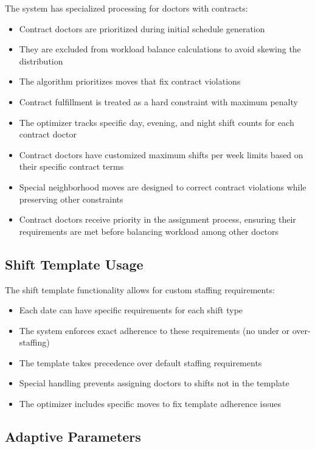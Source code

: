 \documentclass[12pt]{article}
\begin{document}
The system has specialized processing for doctors with contracts:
\begin{itemize}
    \item Contract doctors are prioritized during initial schedule generation
    \item They are excluded from workload balance calculations to avoid skewing the distribution
    \item The algorithm prioritizes moves that fix contract violations
    \item Contract fulfillment is treated as a hard constraint with maximum penalty
    \item The optimizer tracks specific day, evening, and night shift counts for each contract doctor
    \item Contract doctors have customized maximum shifts per week limits based on their specific contract terms
    \item Special neighborhood moves are designed to correct contract violations while preserving other constraints
    \item Contract doctors receive priority in the assignment process, ensuring their requirements are met before balancing workload among other doctors
\end{itemize}

\subsection{Shift Template Usage}

The shift template functionality allows for custom staffing requirements:
\begin{itemize}
    \item Each date can have specific requirements for each shift type
    \item The system enforces exact adherence to these requirements (no under or over-staffing)
    \item The template takes precedence over default staffing requirements
    \item Special handling prevents assigning doctors to shifts not in the template
    \item The optimizer includes specific moves to fix template adherence issues
\end{itemize}

\subsection{Adaptive Parameters}
\end{document}
